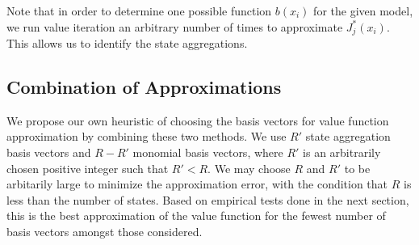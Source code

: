 \documentclass[conference]{IEEEtran}
\begin{document}
	
	Note that in order to determine one possible function $b(x_{i})$ for the given model, we run value iteration an arbitrary number of times to approximate $J^{*}_{j}(x_{i})$. This allows us to identify the state aggregations.
    

\subsection{Combination of Approximations}
    
    We propose our own heuristic of choosing the basis vectors for value function approximation by combining these two methods. We use $R'$ state aggregation basis vectors and $R-R'$ monomial basis vectors, where $R'$ is an arbitrarily chosen positive integer such that $R'<R$. We may choose $R$ and $R'$ to be arbitarily large to minimize the approximation error, with the condition that $R$ is less than the number of states. Based on empirical tests done in the next section, this is the best approximation of the value function for the fewest number of basis vectors amongst those considered.
    
\end{document}
